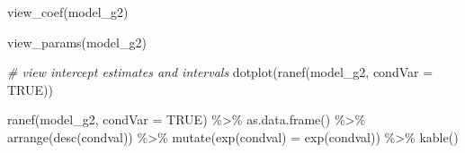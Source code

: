 \documentclass[
  11pt,
]{article}
\newenvironment{Shaded}{\begin{snugshade}}{\end{snugshade}}
\newcommand{\AttributeTok}[1]{\textcolor[rgb]{0.77,0.63,0.00}{#1}}
\newcommand{\CommentTok}[1]{\textcolor[rgb]{0.56,0.35,0.01}{\textit{#1}}}
\newcommand{\ConstantTok}[1]{\textcolor[rgb]{0.00,0.00,0.00}{#1}}
\newcommand{\FunctionTok}[1]{\textcolor[rgb]{0.00,0.00,0.00}{#1}}
\newcommand{\NormalTok}[1]{#1}
\newcommand{\OtherTok}[1]{\textcolor[rgb]{0.56,0.35,0.01}{#1}}
\newcommand{\SpecialCharTok}[1]{\textcolor[rgb]{0.00,0.00,0.00}{#1}}
\newcommand{\StringTok}[1]{\textcolor[rgb]{0.31,0.60,0.02}{#1}}
\begin{document}
\begin{Shaded}
\begin{Highlighting}[]
\FunctionTok{view\_coef}\NormalTok{(model\_g2)}
\end{Highlighting}
\end{Shaded}

\begin{Shaded}
\begin{Highlighting}[]
\FunctionTok{view\_params}\NormalTok{(model\_g2)}
\end{Highlighting}
\end{Shaded}

\begin{Shaded}
\begin{Highlighting}[]
\CommentTok{\# view intercept estimates and intervals}
\FunctionTok{dotplot}\NormalTok{(}\FunctionTok{ranef}\NormalTok{(model\_g2, }\AttributeTok{condVar =} \ConstantTok{TRUE}\NormalTok{))}
\end{Highlighting}
\end{Shaded}

\begin{Shaded}
\begin{Highlighting}[]
\FunctionTok{ranef}\NormalTok{(model\_g2, }\AttributeTok{condVar =} \ConstantTok{TRUE}\NormalTok{) }\SpecialCharTok{\%\textgreater{}\%}
  \FunctionTok{as.data.frame}\NormalTok{() }\SpecialCharTok{\%\textgreater{}\%}
  \FunctionTok{arrange}\NormalTok{(}\FunctionTok{desc}\NormalTok{(condval)) }\SpecialCharTok{\%\textgreater{}\%}
  \FunctionTok{mutate}\NormalTok{(}\StringTok{\textasciigrave{}}\AttributeTok{exp(condval)}\StringTok{\textasciigrave{}} \OtherTok{=} \FunctionTok{exp}\NormalTok{(condval)) }\SpecialCharTok{\%\textgreater{}\%}
  \FunctionTok{kable}\NormalTok{()}
\end{Highlighting}
\end{Shaded}
\end{document}
